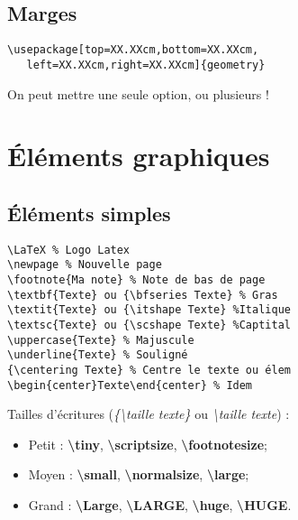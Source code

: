         \subsection{Marges}
            \begin{lstlisting}
\usepackage[top=XX.XXcm,bottom=XX.XXcm,
   left=XX.XXcm,right=XX.XXcm]{geometry}
            \end{lstlisting}
            On peut mettre une seule option, ou plusieurs !


    \section{Éléments graphiques}
        \subsection{Éléments simples}
            \begin{lstlisting}
\LaTeX % Logo Latex
\newpage % Nouvelle page
\footnote{Ma note} % Note de bas de page
\textbf{Texte} ou {\bfseries Texte} % Gras
\textit{Texte} ou {\itshape Texte} %Italique
\textsc{Texte} ou {\scshape Texte} %Captital
\uppercase{Texte} % Majuscule
\underline{Texte} % Souligné
{\centering Texte} % Centre le texte ou élem
\begin{center}Texte\end{center} % Idem
            \end{lstlisting}
            Tailles d'écritures (\textit{\{\textbackslash taille texte\}} ou \textit{\textbackslash taille texte}) :
            \begin{itemize}
                \item Petit : \textbf{\textbackslash tiny}, \textbf{\textbackslash scriptsize}, \textbf{\textbackslash footnotesize};
                \item Moyen : \textbf{\textbackslash small}, \textbf{\textbackslash normalsize}, \textbf{\textbackslash large};
                \item Grand : \textbf{\textbackslash Large}, \textbf{\textbackslash LARGE}, \textbf{\textbackslash huge}, \textbf{\textbackslash HUGE}.
            \end{itemize}
